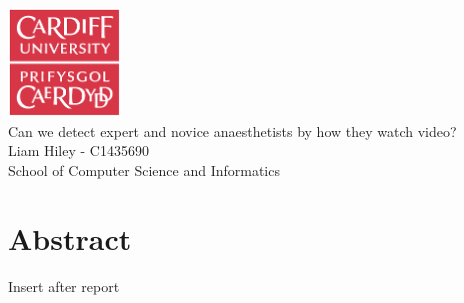\documentclass{report}
\begin{document}
	\begin{titlepage}
		\vspace*{\fill}
		\begin{center}
			\includegraphics[width=3cm]{cardiffuni.png}\\[1cm]
			\Huge{Can we detect expert and novice anaesthetists by how they watch video?}\\[0.5cm]
			\Large{Liam Hiley - C1435690}\\[0.5cm]
			School of Computer Science and Informatics
		\end{center}
		\thispagestyle{fancy}
		\vspace*{\fill}
	\end{titlepage}
	\newpage
	\section{Abstract}
		Insert after report
\end{document}
